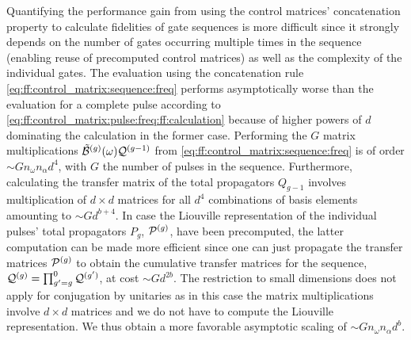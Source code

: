 Quantifying the performance gain from using the control matrices' concatenation property to calculate fidelities of gate sequences is more difficult since it strongly depends on the number of gates occurring multiple times in the sequence (enabling reuse of precomputed control matrices) as well as the complexity of the individual gates.
The evaluation using the concatenation rule \cref{eq:ff:control_matrix:sequence:freq} performs asymptotically worse than the evaluation for a complete pulse according to \cref{eq:ff:control_matrix:pulse:freq:ff:calculation} because of higher powers of $d$ dominating the calculation in the former case.
Performing the $G$ matrix multiplications $\tilde{\mathcal{B}}^{(g)}(\omega)\mathcal{Q}^{(g-1)}$ from \cref{eq:ff:control_matrix:sequence:freq} is of order $\sim G n_\omega n_\alpha d^4$, with $G$ the number of pulses in the sequence.
Furthermore, calculating the transfer matrix of the total propagators $Q_{g-1}$ involves multiplication of $d\times d$ matrices for all $d^4$ combinations of basis elements amounting to $\sim G d^{b+4}$.
In case the Liouville representation of the individual pulses' total propagators $P_g$, $\mathcal{P}^{(g)}$, have been precomputed, the latter computation can be made more efficient since one can just propagate the transfer matrices $\mathcal{P}^{(g)}$ to obtain the cumulative transfer matrices for the sequence, $\mathcal{Q}^{(g)}=\prod_{g^\prime=g}^0\mathcal{Q}^{(g^\prime)}$, at cost $\sim G d^{2b}$.
The restriction to small dimensions does not apply for conjugation by unitaries as in this case the matrix multiplications involve $d\times d$ matrices and we do not have to compute the Liouville representation.
We thus obtain a more favorable asymptotic scaling of $\sim G n_\omega n_\alpha d^b$.

